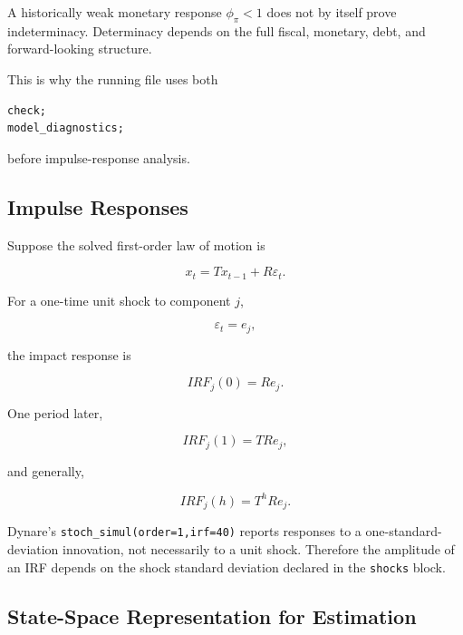 A historically weak monetary response \(\phi_\pi<1\) does not by itself prove
indeterminacy. Determinacy depends on the full fiscal, monetary, debt, and
forward-looking structure.

This is why the running file uses both

\begin{verbatim}
check;
model_diagnostics;
\end{verbatim}

before impulse-response analysis.

\subsection{Impulse Responses}
\label{app:irfs}

Suppose the solved first-order law of motion is

\begin{equation}
x_t
=
Tx_{t-1}
+
R\varepsilon_t.
\label{eq:solution_law}
\end{equation}

For a one-time unit shock to component \(j\),

\[
\varepsilon_t=e_j,
\]

the impact response is

\begin{equation}
IRF_j(0)=Re_j.
\end{equation}

One period later,

\begin{equation}
IRF_j(1)=TRe_j,
\end{equation}

and generally,

\begin{equation}
\boxed{
IRF_j(h)
=
T^hRe_j.
}
\label{eq:irf_formula}
\end{equation}

Dynare's \texttt{stoch\_simul(order=1,irf=40)} reports responses to a
one-standard-deviation innovation, not necessarily to a unit shock. Therefore
the amplitude of an IRF depends on the shock standard deviation declared in the
\texttt{shocks} block.

\subsection{State-Space Representation for Estimation}
\label{app:state_space}


